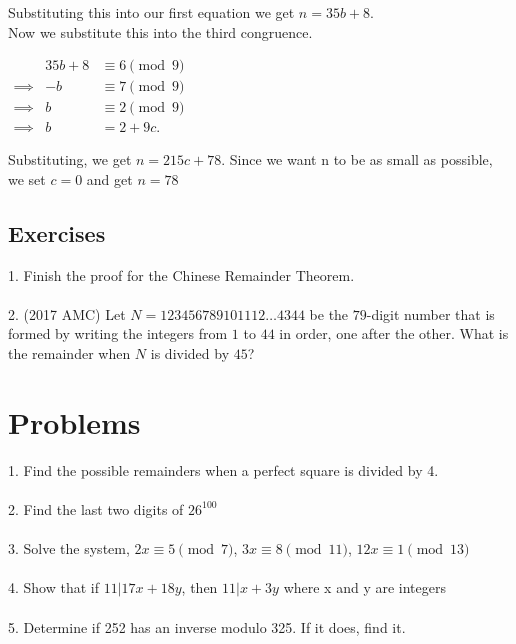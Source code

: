 \documentclass[letterpaper]{article}
\theoremstyle{plain}
\theoremstyle{definition}
\theoremstyle{remark}
\begin{document}
    Substituting this into our first equation we get $n = 35b + 8$. \\
    Now we substitute this into the third congruence.
    \begin{center}
        $\begin{array}{rrll}
            &35b+8 &\equiv 6 \pmod{9} \\
         \implies &-b &\equiv 7 \pmod{9} \\
         \implies &b &\equiv 2 \pmod{9}\\
         \implies &b &= 2 + 9c.
        \end{array}$
    \end{center}
    Substituting, we get $n = 215c + 78$. Since we want n to be as small as possible, we set $c=0$ and get $\boxed{n=78}$
\subsection*{Exercises}
1. Finish the proof for the Chinese Remainder Theorem.\\\\
2. (2017 AMC) Let $N=123456789101112\dots4344$ be the $79$-digit number that is formed by writing the integers from $1$ to $44$ in order, one after the other. What is the remainder when $N$ is divided by $45$?
 
\section{Problems}
1. Find the possible remainders when a perfect square is divided by 4.\\\\
2. Find the last two digits of $26^{100}$\\\\
3. Solve the system, $2x \equiv 5 \pmod{7}$, $3x \equiv 8 \pmod{11}$, $12x \equiv 1 \pmod{13}$\\\\
4. Show that if $11 | 17x+18y$, then $11 | x+3y$ where x and y are integers\\\\
5. Determine if 252 has an inverse modulo 325. If it does, find it.
\end{document}
